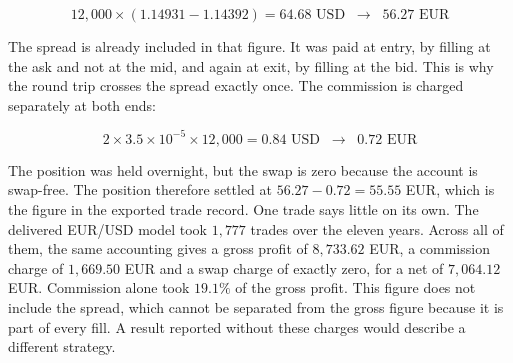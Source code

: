 \begin{equation}
12{,}000 \times \left(1.14931 - 1.14392\right) = 64.68 \text{ USD} \;\;\longrightarrow\;\; 56.27 \text{ EUR}
\label{Equation:WorkedGross}
\end{equation}

The spread is already included in that figure. It was paid at entry, by filling at the ask and not at the mid, and again at exit, by filling at the bid. This is why the round trip crosses the spread exactly once. The commission is charged separately at both ends:

\begin{equation}
2 \times 3.5 \times 10^{-5} \times 12{,}000 = 0.84 \text{ USD} \;\;\longrightarrow\;\; 0.72 \text{ EUR}
\label{Equation:WorkedCommission}
\end{equation}

The position was held overnight, but the swap is zero because the account is swap-free. The position therefore settled at $56.27 - 0.72 = 55.55$ EUR, which is the figure in the exported trade record. One trade says little on its own. The delivered EUR/USD model took $1{,}777$ trades over the eleven years. Across all of them, the same accounting gives a gross profit of $8{,}733.62$ EUR, a commission charge of $1{,}669.50$ EUR and a swap charge of exactly zero, for a net of $7{,}064.12$ EUR. Commission alone took $19.1\%$ of the gross profit. This figure does not include the spread, which cannot be separated from the gross figure because it is part of every fill. A result reported without these charges would describe a different strategy.